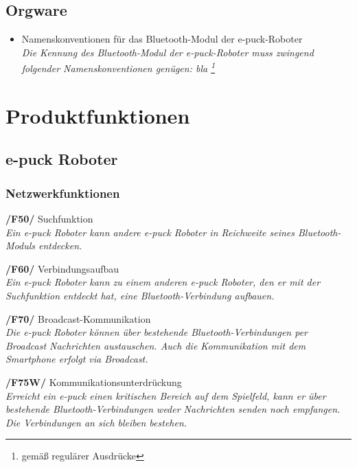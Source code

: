 \documentclass[10pt,a4paper]{article}
\begin{document}
		\subsection{Orgware}
			\begin{itemize}
				\item Namenskonventionen für das Bluetooth-Modul der e-puck-Roboter
					\\ \textsl{Die Kennung des Bluetooth-Modul der e-puck-Roboter muss zwingend folgender Namenskonventionen
						genügen: bla \footnote{gemäß regulärer Ausdrücke}  }
			\end{itemize}		
	\section{Produktfunktionen}
		\subsection{e-puck Roboter}
			\subsubsection{Netzwerkfunktionen}
				\begin{list}{}{\leftmargin=1cm}
					\item[\textbf{/F50/}] Suchfunktion
						\\ \textsl{Ein e-puck Roboter kann andere e-puck Roboter in Reichweite seines Bluetooth-Moduls entdecken.}
					\item[\textbf{/F60/}] Verbindungsaufbau
						\\ \textsl{Ein e-puck Roboter kann zu einem anderen e-puck Roboter, den er mit der Suchfunktion entdeckt
						hat, eine Bluetooth-Verbindung aufbauen.}
					\item[\textbf{/F70/}] Broadcast-Kommunikation
						\\ \textsl{Die e-puck Roboter können über bestehende Bluetooth-Verbindungen per Broadcast
						Nachrichten austauschen. Auch die Kommunikation mit dem Smartphone erfolgt via Broadcast.}
					\item[\textbf{/F75W/}] Kommunikationsunterdrückung
						\\ \textsl{Erreicht ein e-puck einen kritischen Bereich auf dem Spielfeld, kann er über bestehende
						Bluetooth-Verbindungen weder Nachrichten senden noch empfangen. Die Verbindungen an sich bleiben bestehen.}
				\end{list}
\end{document}

